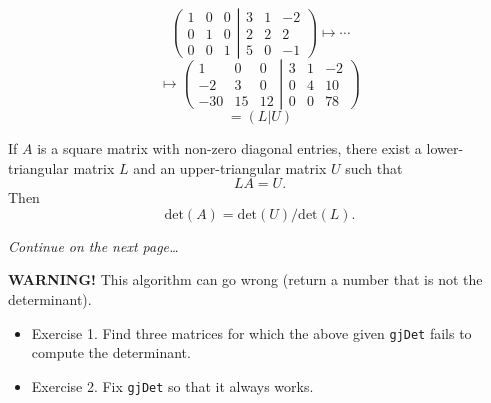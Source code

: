 %
\begin{frame}{}
	\[
		\left(
			\begin{array}{ccc}
				1 & 0 & 0\\
				0 & 1 & 0\\
				0 & 0 & 1
			\end{array}
		\right.
		\left|
			\begin{array}{ccc}
				3 & 1 & -2\\
				2 & 2 & 2\\
				5 & 0 & -1
			\end{array}
		\right)
		\mapsto
		\cdots
	\]
	\[
		\mapsto
		\left(
			\begin{array}{ccc}
				1 & 0 & 0\\
				-2 & 3 & 0\\
				-30 & 15 & 12
			\end{array}
		\right.
		\left|
			\begin{array}{ccc}
				3 & 1 & -2\\
				0 & 4 & 10\\
				0 & 0 & 78
			\end{array}
		\right)
	\]
	\[
		=
		\left(
		\right.
		L
		\left|
		U
		\right)
	\]
\end{frame}
%
\begin{frame}{}
	\begin{theorem}
		If $A$ is a square matrix with non-zero diagonal entries, there
		exist a lower-triangular matrix $L$ and an upper-triangular matrix
		$U$ such that
		\[
			LA = U.
		\]
		Then
		\[
			\mathrm{det}(A) = \mathrm{det}(U)/\mathrm{det}(L).
		\]
	\end{theorem}
\end{frame}
%
\begin{frame}{}
	
	\textit{Continue on the next page\ldots}
\end{frame}
%
\begin{frame}{}
	
	\textbf{WARNING!} This algorithm can go wrong (return a number that is
	not the determinant).
\end{frame}
%
\begin{frame}{}
	\begin{itemize}
		\item Exercise 1. Find three matrices for which the above given \texttt{gjDet}
			fails to compute the determinant.
		\item Exercise 2. Fix \texttt{gjDet} so that it always works.
	\end{itemize}
\end{frame}
